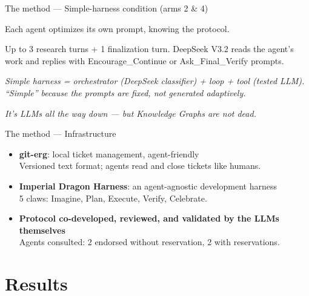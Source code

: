 \documentclass[aspectratio=169]{beamer}
\begin{document}
\begin{frame}{The method --- Simple-harness condition (arms 2 \& 4)}
\begin{description}\setlength\itemsep{8pt}
  \item[\textbf{Phase A is reflexive}] Each agent optimizes its own prompt, knowing the protocol.
  \item[\textbf{Phase B is scripted}] Up to 3 research turns + 1 finalization turn. DeepSeek V3.2 reads the agent's work and replies with Encourage\_Continue or Ask\_Final\_Verify prompts.
\end{description}

\smallskip
{\small\textit{Simple harness = orchestrator (DeepSeek classifier) + loop + tool (tested LLM). ``Simple'' because the prompts are fixed, not generated adaptively.}}

\medskip
\begin{center}
{\small\textit{It's LLMs all the way down --- but Knowledge Graphs are not dead.}}
\end{center}
\end{frame}

\begin{frame}{The method --- Infrastructure}
\begin{itemize}\setlength\itemsep{6pt}
  \item \textbf{git-erg}: local ticket management, agent-friendly\\
        {\small Versioned text format; agents read and close tickets like humans.}
  \item \textbf{Imperial Dragon Harness}: an agent-agnostic development harness\\
        {\small 5 claws: Imagine, Plan, Execute, Verify, Celebrate.}
  \item \textbf{Protocol co-developed, reviewed, and validated by the LLMs themselves}\\
        {\small Agents consulted: 2 endorsed without reservation, 2 with reservations.}
\end{itemize}
\end{frame}

\section{Results}
\end{document}
